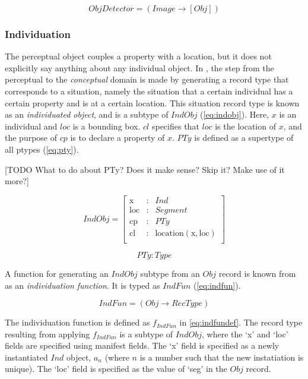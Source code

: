 \begin{equation}\label{eq:objdetector}
ObjDetector = ( Image \rightarrow [Obj] )
\end{equation}



\subsubsection{Individuation}

The perceptual object couples a property with a location, but it does not explicitly say anything about any individual object.
In \cite{lspc}, the step from the perceptual to the \textit{conceptual} domain is made by generating a record type that corresponds to a situation, namely the situation that a certain individual has a certain property and is at a certain location.
This situation record type is known as an \textit{individuated object}, and is a subtype of $IndObj$ (\autoref{eq:indobj}).
Here, $x$ is an individual and $loc$ is a bounding box.
$cl$ specifies that $loc$ is the location of $x$, and the purpose of $cp$ is to declare a property of $x$.
$PTy$ is defined as a supertype of all ptypes (\autoref{eq:pty}).

[TODO What to do about PTy? Does it make sense? Skip it? Make use of it more?]

\begin{equation}\label{eq:indobj}
IndObj = \left[\begin{array}{rcl}
\text{x} &:& Ind \\
\text{loc} &:& Segment \\
\text{cp} &:& PTy \\
\text{cl} &:& \text{location}(\text{x}, \text{loc}) \\
\end{array}\right]
\end{equation}

\begin{equation}\label{eq:pty}
PTy : Type
\end{equation}

A function for generating an $IndObj$ subtype from an $Obj$ record is known from \cite{lspc} as an \textit{individuation function}.
It is typed as $IndFun$ (\autoref{eq:indfun}).

\begin{equation}\label{eq:indfun}
IndFun = ( Obj \rightarrow RecType )
\end{equation}

The individuation function is defined as $f_{IndFun}$ in \autoref{eq:indfundef}.
The record type resulting from applying $f_{IndFun}$ is a subtype of $IndObj$, where the `x' and `loc' fields are specified using manifest fields.
The `x' field is specified as a newly instantiated $Ind$ object, $a_n$ (where $n$ is a number such that the new instatiation is unique).
The `loc' field is specified as the value of `seg' in the $Obj$ record.

